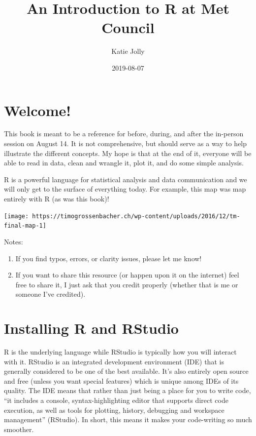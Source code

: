 \documentclass[]{book}
\title{An Introduction to R at Met Council}
\author{Katie Jolly}
\date{2019-08-07}
\begin{document}
\maketitle

{
\setcounter{tocdepth}{1}
\tableofcontents
}
\chapter{Welcome!}\label{welcome}

This book is meant to be a reference for before, during, and after the
in-person session on August 14. It is not comprehensive, but should
serve as a way to help illustrate the different concepts. My hope is
that at the end of it, everyone will be able to read in data, clean and
wrangle it, plot it, and do some simple analysis.

R is a powerful language for statistical analysis and data communication
and we will only get to the surface of everything today. For example,
this map was map entirely with R (as was this book)!

\texttt{[image: https://timogrossenbacher.ch/wp-content/uploads/2016/12/tm-final-map-1]}

Notes:

\begin{enumerate}
\def\labelenumi{\arabic{enumi}.}
\item
  If you find typos, errors, or clarity issues, please let me know!
\item
  If you want to share this resource (or happen upon it on the internet)
  feel free to share it, I just ask that you credit properly (whether
  that is me or someone I've credited).
\end{enumerate}

\chapter{Installing R and RStudio}\label{setup}

R is the underlying language while RStudio is typically how you will
interact with it. RStudio is an integrated development environment (IDE)
that is generally considered to be one of the best available. It's also
entirely open source and free (unless you want special features) which
is unique among IDEs of its quality. The IDE means that rather than just
being a place for you to write code, ``it includes a console,
syntax-highlighting editor that supports direct code execution, as well
as tools for plotting, history, debugging and workspace management''
(RStudio). In short, this means it makes your code-writing so much
smoother.
\end{document}
